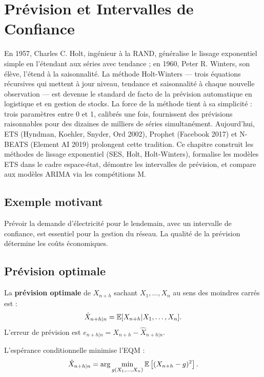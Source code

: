 \chapter{Pr\'evision et Intervalles de Confiance}
\label{ch:prevision}

En 1957, Charles C. Holt, ingénieur à la RAND, généralise le lissage exponentiel simple en l'étendant aux séries avec tendance ; en 1960, Peter R. Winters, son élève, l'étend à la saisonnalité. La méthode Holt-Winters --- trois équations récursives qui mettent à jour niveau, tendance et saisonnalité à chaque nouvelle observation --- est devenue le standard de facto de la prévision automatique en logistique et en gestion de stocks. La force de la méthode tient à sa simplicité : trois paramètres entre 0 et 1, calibrés une fois, fournissent des prévisions raisonnables pour des dizaines de milliers de séries simultanément. Aujourd'hui, ETS (Hyndman, Koehler, Snyder, Ord 2002), Prophet (Facebook 2017) et N-BEATS (Element AI 2019) prolongent cette tradition. Ce chapitre construit les méthodes de lissage exponentiel (SES, Holt, Holt-Winters), formalise les modèles ETS dans le cadre espace-état, démontre les intervalles de prévision, et compare aux modèles ARIMA via les compétitions M.

\section{Exemple motivant}
Pr\'evoir la demande d'\'electricit\'e pour le lendemain, avec un intervalle de confiance, est essentiel pour la gestion du r\'eseau. La qualit\'e de la pr\'evision d\'etermine les co\^uts \'economiques.

\section{Pr\'evision optimale}

\begin{definition}
La \textbf{pr\'evision optimale} de $X_{n+h}$ sachant $X_1,\ldots,X_n$ au sens des moindres carr\'es est :
\[
\hat{X}_{n+h|n} = \mathbb{E}[X_{n+h}|X_1,\ldots,X_n].
\]
L'erreur de pr\'evision est $e_{n+h|n}=X_{n+h}-\hat{X}_{n+h|n}$.
\end{definition}

\begin{theoreme}
L'esp\'erance conditionnelle minimise l'EQM :
\[
\hat{X}_{n+h|n} = \arg\min_{g(X_1,\ldots,X_n)}\mathbb{E}\left[(X_{n+h}-g)^2\right].
\]
\end{theoreme}

